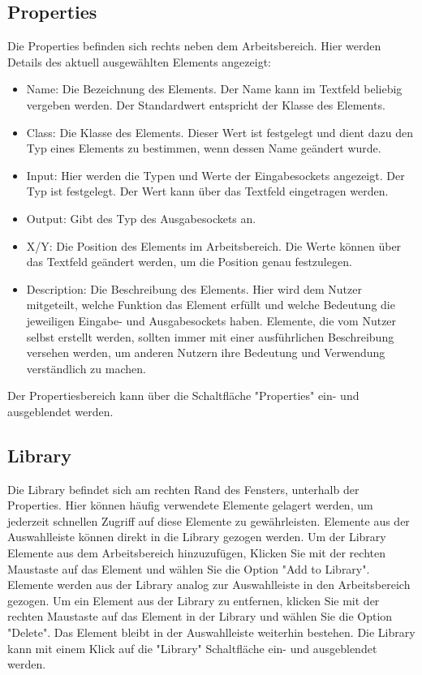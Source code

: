 \subsection{Properties} \label{sub:Properties}
Die Properties befinden sich rechts neben dem Arbeitsbereich. Hier werden Details des aktuell ausgew\"ahlten Elements angezeigt:
\\
\begin{itemize}
	\item Name: Die Bezeichnung des Elements. Der Name kann im Textfeld beliebig vergeben werden. Der Standardwert entspricht der Klasse des Elements.
	\item Class: Die Klasse des Elements. Dieser Wert ist festgelegt und dient dazu den Typ eines Elements zu bestimmen, wenn dessen Name ge\"andert wurde.
	\item Input: Hier werden die Typen und Werte der Eingabesockets angezeigt. Der Typ ist festgelegt. Der Wert kann \"uber das Textfeld eingetragen werden.
	\item Output: Gibt des Typ des Ausgabesockets an.
	\item X/Y: Die Position des Elements im Arbeitsbereich. Die Werte k\"onnen \"uber das Textfeld ge\"andert werden, um die Position genau festzulegen.
	\item Description: Die Beschreibung des Elements. Hier wird dem Nutzer mitgeteilt, welche Funktion das Element erf\"ullt und welche Bedeutung die jeweiligen Eingabe- und Ausgabesockets haben. Elemente, die vom Nutzer selbst erstellt werden, sollten immer mit einer ausf\"uhrlichen Beschreibung versehen werden, um anderen Nutzern ihre Bedeutung und Verwendung verst\"andlich zu machen.
\end{itemize}
Der Propertiesbereich kann \"uber die Schaltfl\"ache "Properties" ein- und ausgeblendet werden.

\subsection{Library} \label{sub:Library}
Die Library befindet sich am rechten Rand des Fensters, unterhalb der Properties. Hier k\"onnen h\"aufig verwendete Elemente gelagert werden, um jederzeit schnellen Zugriff auf diese Elemente zu gew\"ahrleisten.
Elemente aus der Auswahlleiste k\"onnen direkt in die Library gezogen werden. Um der Library Elemente aus dem Arbeitsbereich hinzuzuf\"ugen, Klicken Sie mit der rechten Maustaste auf das Element und w\"ahlen Sie die Option "Add to Library". Elemente werden aus der Library analog zur Auswahlleiste in den Arbeitsbereich gezogen. Um ein Element aus der Library zu entfernen, klicken Sie mit der rechten Maustaste auf das Element in der Library und w\"ahlen Sie die Option "Delete". Das Element bleibt in der Auswahlleiste weiterhin bestehen. Die Library kann mit einem Klick auf die "Library" Schaltfl\"ache ein- und ausgeblendet werden.

